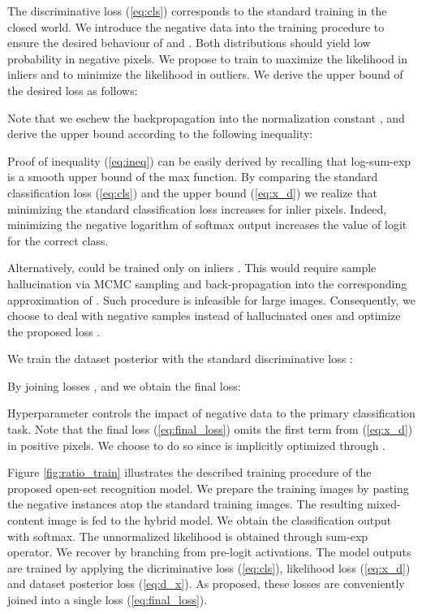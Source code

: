 \documentclass[runningheads]{llncs}
\begin{document}
The discriminative loss (\ref{eq:cls}) corresponds to the standard training in the closed world.
We introduce the negative data  into the training procedure to ensure the desired behaviour of  and   \cite{hendrycks19iclr,bevandic19gcpr}.
Both distributions should yield low probability in negative pixels.
We propose to train  to maximize the likelihood in inliers and to minimize the likelihood in outliers.
We derive the upper bound of the desired loss as follows:

Note that we eschew the backpropagation into the normalization constant , and derive the upper bound according to the following inequality:

Proof of inequality (\ref{eq:ineq}) can be easily derived by recalling that log-sum-exp is a smooth upper bound of the max function.
By comparing the standard classification loss (\ref{eq:cls}) and the upper bound (\ref{eq:x_d}) we realize that minimizing the standard classification loss increases  for inlier pixels.
Indeed, minimizing the negative logarithm of softmax output increases the value of logit for the correct class.

Alternatively,  could be trained only on inliers \cite{salakhutdinov09aistats,du19neurips,grathwohl20iclr}.
This would require sample hallucination via MCMC sampling and back-propagation into the corresponding approximation of .
Such procedure is infeasible for large images.
Consequently, we choose to deal with negative samples instead of hallucinated ones and optimize
the proposed loss .

We train the dataset posterior  with the standard discriminative loss \cite{bevandic19gcpr}:

By joining losses ,  and  we obtain the final loss:

Hyperparameter  controls the impact of negative data to the primary classification task.
Note that the final loss (\ref{eq:final_loss}) omits the first term from  (\ref{eq:x_d}) in positive pixels.
We choose to do so since  is implicitly optimized through .


Figure \ref{fig:ratio_train} illustrates the described training procedure of the proposed open-set recognition model.
We prepare the training images by pasting the negative instances atop the standard training images.
The resulting mixed-content image \cite{bevandic19gcpr} is fed to the hybrid model.
We obtain the classification output  with softmax.
The unnormalized likelihood  is obtained through sum-exp operator.
We recover  by branching from pre-logit activations. 
The model outputs are trained by applying the dicriminative loss   (\ref{eq:cls}), likelihood loss  (\ref{eq:x_d}) and dataset posterior loss  (\ref{eq:d_x}).
As proposed, these losses are conveniently joined into a single loss  (\ref{eq:final_loss}).
\end{document}
